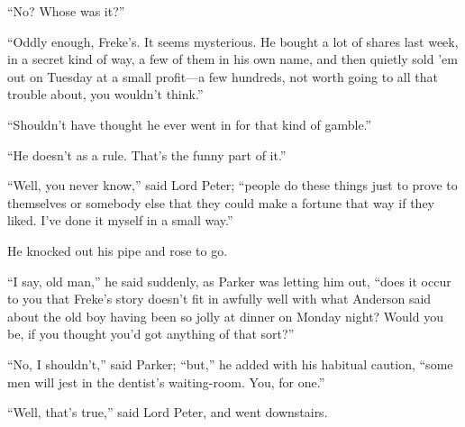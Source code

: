 \enquote{No? Whose was it?}

\enquote{Oddly enough, Freke’s. It seems mysterious. He bought a lot of shares last week, in a secret kind of way, a few of them in his own name, and then quietly sold ’em out on Tuesday at a small profit\allowbreak---\allowbreak a few hundreds, not worth going to all that trouble about, you wouldn’t think.}

\enquote{Shouldn’t have thought he ever went in for that kind of gamble.}

\enquote{He doesn’t as a rule. That’s the funny part of it.}

\enquote{Well, you never know,} said Lord Peter; \enquote{people do these things just to prove to themselves or somebody else that they could make a fortune that way if they liked. I’ve done it myself in a small way.}

He knocked out his pipe and rose to go.

\enquote{I say, old man,} he said suddenly, as Parker was letting him out, \enquote{does it occur to you that Freke’s story doesn’t fit in awfully well with what Anderson said about the old boy having been so jolly at dinner on Monday night? Would you be, if you thought you’d got anything of that sort?}

\enquote{No, I shouldn’t,} said Parker; \enquote{but,} he added with his habitual caution, \enquote{some men will jest in the dentist’s waiting-room. You, for one.}

\enquote{Well, that’s true,} said Lord Peter, and went downstairs.
